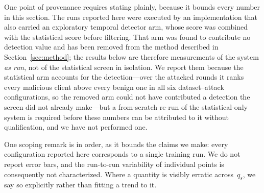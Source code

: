\documentclass[journal]{IEEEtran}
\begin{document}
One point of provenance requires stating plainly, because it bounds every number in this section. The runs reported here were executed by an implementation that also carried an exploratory temporal detector arm, whose score was combined with the statistical score before filtering. That arm was found to contribute no detection value and has been removed from the method described in Section~\ref{sec:method}; the results below are therefore measurements of the system \emph{as run}, not of the statistical screen in isolation. We report them because the statistical arm accounts for the detection---over the attacked rounds it ranks every malicious client above every benign one in all six dataset--attack configurations, so the removed arm could not have contributed a detection the screen did not already make---but a from-scratch re-run of the statistical-only system is required before these numbers can be attributed to it without qualification, and we have not performed one.

One scoping remark is in order, as it bounds the claims we make: every configuration reported here corresponds to a single training run. We do not report error bars, and the run-to-run variability of individual points is consequently not characterized. Where a quantity is visibly erratic across~$q_s$, we say so explicitly rather than fitting a trend to it.
\end{document}
